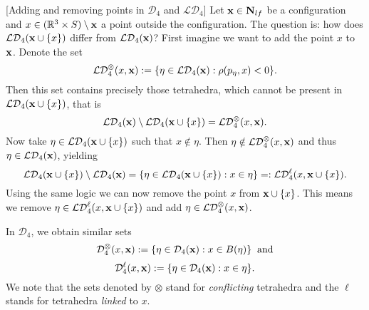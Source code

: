 


\begin{remark}\label{r:addremove}[Adding and removing points in $\mathcal D_4$ and $\mathcal {LD}_4$]
	Let ${\mathbf{x}}\in \mathbf N_{lf}$ be a configuration and $x\in({\mathbb R^3} \times S) \setminus {\mathbf{x}}$ a point outside the configuration. The question is: how does $\mathcal {LD}_4({\mathbf{x}} \cup \{x\})$ differ from $\mathcal {LD}_4({\mathbf{x}})$?
	First imagine we want to add the point $x$ to ${\mathbf{x}}$. Denote the set 
	$$\mathcal {LD}_4^\otimes(x,{\mathbf{x}}) := \{\eta \in \mathcal {LD}_4({\mathbf{x}}): \rho(p_\eta,x) < 0\}.$$
	Then this set contains precisely those tetrahedra, which cannot be present in $\mathcal {LD}_4({\mathbf{x}} \cup \{x\})$, that is
	$$ \mathcal {LD}_4 ({\mathbf{x}}) \setminus \mathcal {LD}_4({\mathbf{x}} \cup \{x\}) = \mathcal {LD}_4^\otimes(x,{\mathbf{x}}).$$
	Now take $\eta \in \mathcal {LD}_4({\mathbf{x}} \cup \{x\})$ such that $x \notin \eta$. Then $\eta \notin \mathcal {LD}_4^\otimes(x,{\mathbf{x}})$ and thus $\eta \in \mathcal {LD}_4({\mathbf{x}})$, yielding
	$$\mathcal {LD}_4 ({\mathbf{x}} \cup \{x\}) \setminus \mathcal {LD}_4({\mathbf{x}}) = \{ \eta \in \mathcal {LD}_4({\mathbf{x}}\cup\{x\}): x \in \eta\} =: \mathcal {LD}_4^\ell(x, {\mathbf{x}} \cup \{x\}).$$
	Using the same logic we can now remove the point $x$ from ${\mathbf{x}} \cup \{x\}$. This means we remove $\eta \in \mathcal {LD}_4^\ell(x,{\mathbf{x}}\cup\{x\})$ and add $\eta \in \mathcal {LD}_4^\otimes(x,{\mathbf{x}})$.\newline

	\noindent In $\mathcal D_4$, we obtain similar sets
	$$\mathcal D_4^\otimes(x,{\mathbf{x}}) := \{\eta \in \mathcal D_4({\mathbf{x}}): x \in B(\eta)\} \;\; \text{and}$$
	$$\mathcal D_4^\ell(x,{\mathbf{x}}) := \{\eta \in \mathcal D_4({\mathbf{x}}): x\in \eta \}.$$
	We note that the sets denoted by $\otimes$ stand for \textit{conflicting} tetrahedra and the $\ell$ stands for tetrahedra \textit{linked} to $x$. 

\end{remark}
